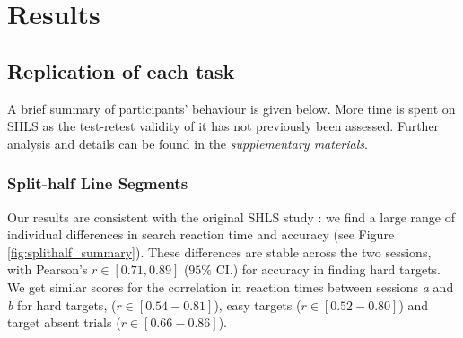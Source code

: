 \documentclass[a4paper, man, natbib, floatsintext]{apa6}
\begin{document}
\section{Results}

\subsection{Replication of each task}

A brief summary of participants' behaviour is given below. More time is spent on SHLS as the test-retest validity of it has not previously been assessed. Further analysis and details can be found in the \textit{supplementary materials}.

\subsubsection{Split-half Line Segments}

Our results are consistent with the original SHLS study \citep{nowakowska2017}: we find a large range of individual differences in search reaction time and accuracy (see Figure \ref{fig:splithalf_summary}). These differences are stable across the two sessions, with Pearson's $r \in [0.71, 0.89]$ ($95\%$ CI.) for accuracy in finding hard targets. We get similar scores for the correlation in reaction times between sessions \textit{a} and \textit{b} for hard targets, ($r \in [0.54-0.81]$), easy targets ($r \in [0.52-0.80]$) and target absent trials ($r \in [0.66-0.86]$). 
\end{document}
